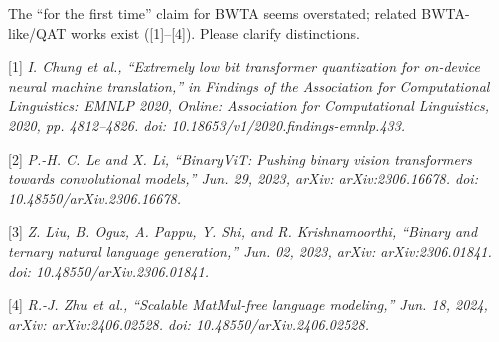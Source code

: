 \begin{revcomment}
The ``for the first time'' claim for BWTA seems overstated; related BWTA-like/QAT works exist ([1]–[4]). Please clarify distinctions. 

[1] \textit{I. Chung et al., ``Extremely low bit transformer quantization for on-device neural machine translation,'' in Findings of the Association for Computational Linguistics: EMNLP 2020, Online: Association for Computational Linguistics, 2020, pp. 4812–4826. doi: 10.18653/v1/2020.findings-emnlp.433.}

[2] \textit{P.-H. C. Le and X. Li, ``BinaryViT: Pushing binary vision transformers towards convolutional models,'' Jun. 29, 2023, arXiv: arXiv:2306.16678. doi: 10.48550/arXiv.2306.16678.}

[3] \textit{Z. Liu, B. Oguz, A. Pappu, Y. Shi, and R. Krishnamoorthi, ``Binary and ternary natural language generation,'' Jun. 02, 2023, arXiv: arXiv:2306.01841. doi: 10.48550/arXiv.2306.01841.}

[4] \textit{R.-J. Zhu et al., ``Scalable MatMul-free language modeling,'' Jun. 18, 2024, arXiv: arXiv:2406.02528. doi: 10.48550/arXiv.2406.02528.}






\end{revcomment}
